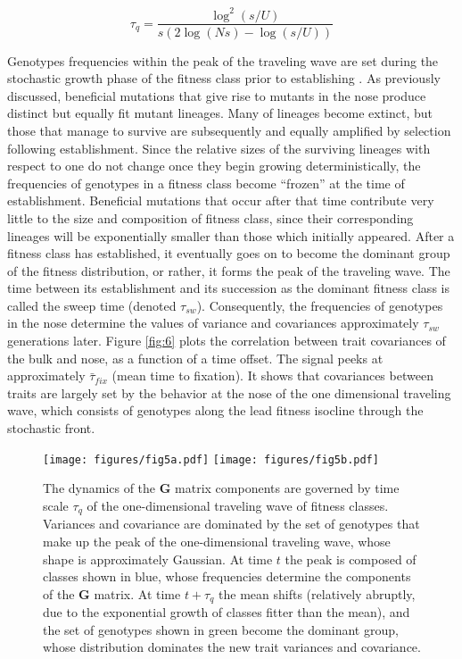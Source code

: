 \documentclass[9pt,twocolumn,twoside]{gsajnl}
\newcommand{\G}{\textbf{G }}
\begin{document}
\begin{equation}\label{eq:8}
\tau_q = \frac{\log^2(s/U)}{s(2\log(Ns)-\log(s/U))}
\end{equation}\par

Genotypes frequencies within the peak of the traveling wave are set during the stochastic growth phase of the fitness class prior to establishing \citep{Desai2013}.  As previously discussed, beneficial mutations that give rise to mutants in the nose produce distinct but equally fit mutant lineages. Many of lineages become extinct, but those that manage to survive are subsequently and equally amplified by selection following establishment. Since the relative sizes of the surviving lineages with respect to one do not change once they begin growing deterministically, the frequencies of genotypes in a fitness class become ``frozen'' at the time of establishment. Beneficial mutations that occur after that time contribute very little to the size and composition of fitness class, since their corresponding lineages will be exponentially smaller than those which initially appeared. After a fitness class has established, it eventually goes on to become the dominant group of the fitness distribution, or rather, it forms the peak of the traveling wave. The time between its establishment and its succession as the dominant fitness class is called the sweep time (denoted $\tau_{sw}$). Consequently, the frequencies of genotypes in the nose determine the values of variance and covariances approximately $\tau_{sw}$ generations later. Figure \ref{fig:6} plots the correlation between trait covariances of the bulk and nose, as a function of a time offset. The signal peeks at approximately $\bar{\tau}_{fix}$ (mean time to fixation). It shows that covariances between traits are largely set by the behavior at the nose of the one dimensional traveling wave, which consists of genotypes along the lead fitness isocline through the stochastic front. 

\begin{figure}[!ht]
\texttt{[image: figures/fig5a.pdf]}
\texttt{[image: figures/fig5b.pdf]}
\caption{\footnotesize The dynamics of the \G matrix components are governed by time scale $\tau_q$ of the one-dimensional traveling wave of fitness classes. Variances and covariance are dominated by the set of genotypes that make up the peak of the one-dimensional traveling wave, whose shape is approximately Gaussian. At time $t$ the peak is composed of classes shown in blue, whose frequencies determine the components of the \G  matrix. At time $t+\tau_q$ the mean shifts (relatively abruptly, due to the exponential growth of classes fitter than the mean), and the set of genotypes shown in green become the dominant group, whose distribution dominates the new trait variances and covariance.}\label{fig:5}
% 
% 
\end{figure}
\end{document}
